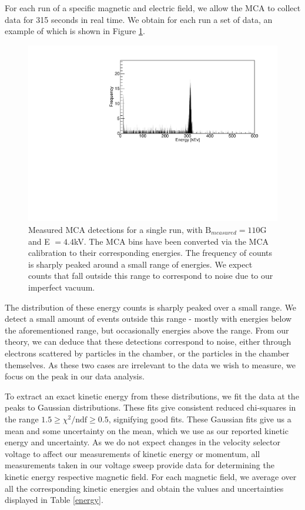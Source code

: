For each run of a specific magnetic and electric field, we allow the MCA to collect data for 315 seconds in real time. We obtain for each run a set of data, an example of which is shown in Figure \ref{mca}.

\begin{figure}[h]
  \includegraphics[width=.5\textwidth]{mca-readout-clean.pdf}
  \caption{Measured MCA detections for a single run, with $\text{B}_{measured} = 110$G and E $ = 4.4$kV. The MCA bins have been converted via the MCA calibration to their corresponding energies. The frequency of counts is sharply peaked around a small range of energies. We expect counts that fall outside this range to correspond to noise due to our imperfect vacuum.}
  \label{mca}
  \end{figure}
      
The distribution of these energy counts is sharply peaked over a small range. We detect a small amount of events outside this range - mostly with energies below the aforementioned range, but occasionally energies above the range. From our theory, we can deduce that these detections correspond to noise, either through electrons scattered by particles in the chamber, or the particles in the chamber themselves. As these two cases are irrelevant to the data we wish to measure, we focus on the peak in our data analysis.

To extract an exact kinetic energy from these distributions, we fit the data at the peaks to Gaussian distributions. These fits give consistent reduced chi-squares in the range $1.5 \geq \chi^2/\text{ndf} \geq 0.5$, signifying good fits. These Gaussian fits give us a mean and some uncertainty on the mean, which we use as our reported kinetic energy and uncertainty. As we do not expect changes in the velocity selector voltage to affect our measurements of kinetic energy or momentum, all measurements taken in our voltage sweep provide data for determining the kinetic energy respective magnetic field. For each magnetic field, we average over all the corresponding kinetic energies and obtain the values and uncertainties displayed in Table \ref{energy}.

